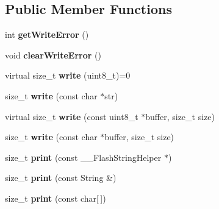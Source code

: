 \subsection*{Public Member Functions}
\begin{DoxyCompactItemize}
\item 
int {\bfseries get\+Write\+Error} ()\hypertarget{class_print_a88a4a829fb5d589efb43955ad0cbddcc}{}\label{class_print_a88a4a829fb5d589efb43955ad0cbddcc}

\item 
void {\bfseries clear\+Write\+Error} ()\hypertarget{class_print_aec9ecf84cc6d9087a650def3cefc459e}{}\label{class_print_aec9ecf84cc6d9087a650def3cefc459e}

\item 
virtual size\+\_\+t {\bfseries write} (uint8\+\_\+t)=0\hypertarget{class_print_a5be30d49adae2406a270c29ba9a3e0a3}{}\label{class_print_a5be30d49adae2406a270c29ba9a3e0a3}

\item 
size\+\_\+t {\bfseries write} (const char $\ast$str)\hypertarget{class_print_a5b40e0e9cab1f2fe5bb0cb22ffe5adda}{}\label{class_print_a5b40e0e9cab1f2fe5bb0cb22ffe5adda}

\item 
virtual size\+\_\+t {\bfseries write} (const uint8\+\_\+t $\ast$buffer, size\+\_\+t size)\hypertarget{class_print_ad98d820df11e2697be1e4b1ea30b4a23}{}\label{class_print_ad98d820df11e2697be1e4b1ea30b4a23}

\item 
size\+\_\+t {\bfseries write} (const char $\ast$buffer, size\+\_\+t size)\hypertarget{class_print_abfdd93a61c4b95a3ba41680188505e73}{}\label{class_print_abfdd93a61c4b95a3ba41680188505e73}

\item 
size\+\_\+t {\bfseries print} (const \+\_\+\+\_\+\+Flash\+String\+Helper $\ast$)\hypertarget{class_print_aa4158dd94bc1741f92d99c427261d7c0}{}\label{class_print_aa4158dd94bc1741f92d99c427261d7c0}

\item 
size\+\_\+t {\bfseries print} (const String \&)\hypertarget{class_print_a157007ca7ea8334ba7eb4bc705740216}{}\label{class_print_a157007ca7ea8334ba7eb4bc705740216}

\item 
size\+\_\+t {\bfseries print} (const char\mbox{[}$\,$\mbox{]})\hypertarget{class_print_acfe80773011eb17dfb52c2fba517a093}{}\label{class_print_acfe80773011eb17dfb52c2fba517a093}


\end{DoxyCompactItemize}
